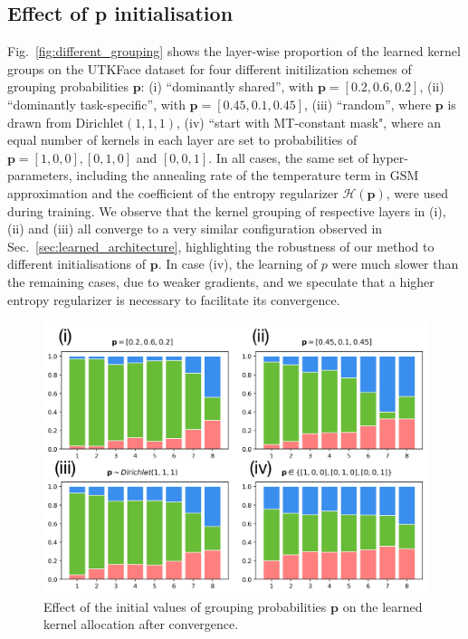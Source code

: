 \subsection{Effect of \textbf{p} initialisation}
Fig.~\ref{fig:different_grouping} shows the layer-wise proportion of the learned kernel groups on the UTKFace dataset for four different initilization schemes of grouping probabilities $\mathbf{p}$: (i) ``dominantly shared'', with $\mathbf{p}=[0.2, 0.6, 0.2]$, (ii) ``dominantly task-specific'', with $\mathbf{p}=[0.45, 0.1, 0.45]$, (iii) ``random'', where $\mathbf{p}$ is drawn from $\text{Dirichlet}(1,1,1)$, (iv) ``start with MT-constant mask", where an equal number of kernels in each layer are set to probabilities of $\mathbf{p}= [1,0,0],[0,1,0]$ and $[0,0,1]$. In all cases, the same set of hyper-parameters, including the annealing rate of the temperature term in GSM approximation and the coefficient of the entropy regularizer $\mathcal{H}(\mathbf{p})$, were used during training. We observe that the kernel grouping of respective layers in (i), (ii) and (iii) all converge to a very similar configuration observed in Sec.~\ref{sec:learned_architecture}, highlighting the robustness of our method to different initialisations of $\mathbf{p}$. In case (iv), the learning of $p$ were much slower than the remaining cases, due to weaker gradients, and we speculate that a higher entropy regularizer is necessary to facilitate its convergence. 


\begin{figure}[t!]
	\center
	\includegraphics[width= 0.7\linewidth]{chapter_6/figures/DIFFERENT_P.pdf}
	\caption{Effect of the initial values of grouping probabilities $\mathbf{p}$ on the learned kernel allocation after convergence. }
    \label{fig:performance_on_small_data}
\end{figure}




